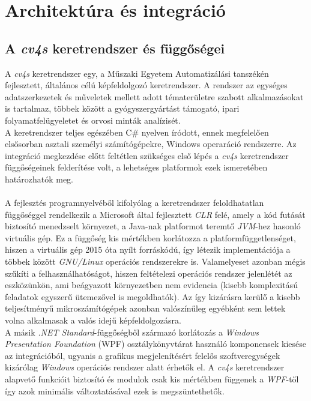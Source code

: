 \chapter{Architektúra és integráció} \label{chapter:architektura}

\section{A \emph{cv4s} keretrendszer és függőségei} \label{fuggosegek}


A \emph{cv4s} keretrendszer egy, a Műszaki Egyetem Automatizálási tanszékén fejlesztett, általános célú képfeldolgozó keretrendszer. A rendszer az egységes adatszerkezetek és műveletek mellett adott tématerületre szabott alkalmazásokat is tartalmaz, többek között a gyógyszergyártást támogató, ipari folyamatfelügyeletet és orvosi minták analízisét. \\
A keretrendszer teljes egészében C\# nyelven íródott, ennek megfelelően elsősorban asztali személyi számítógépekre, Windows operaráció rendszerre. Az integráció megkezdése előtt feltétlen szükséges első lépés a \emph{cv4s} keretrendszer függőségeinek felderítése volt, a lehetséges platformok ezek ismeretében határozhatók meg. \\
\\
A fejlesztés programnyelvéből kifolyólag a keretrendszer feloldhatatlan függőséggel rendelkezik a Microsoft által fejlesztett \emph{CLR} felé, amely a kód futását biztosító menedzselt környezet, a Java-nak platformot teremtő \emph{JVM}-hez hasonló virtuális gép. Ez a függőség kis mértékben korlátozza a platformfüggetlenséget, hiszen a virtuális gép 2015 óta nyílt forráskódú, így létezik implementációja a többek között \emph{GNU/Linux} operációs rendszerekre is. Valamelyeset azonban mégis szűkíti a felhasználhatóságot, hiszen feltételezi operációs rendszer jelenlétét az eszközünkön, ami beágyazott környezetben nem evidencia (kisebb komplexitású feladatok egyszerű ütemezővel is megoldhatók). Az így kizárásra kerülő a kisebb teljesítményű mikroszámítógépek azonban valószínűleg egyébként sem lettek volna alkalmasak a valós idejű képfeldolgozásra. \\
A másik \emph{.NET Standard}-függőségből származó korlátozás a \emph{Windows Presentation Foundation} (WPF) osztálykönyvtárat használó komponensek kiesése az integrációból, ugyanis a grafikus megjelenítésért felelős szoftveregységek kizárólag \textit{Windows} operációs rendszer alatt érhetők el. A \emph{cv4s} keretrendszer alapvető funkcióit biztosító  és  modulok csak kis mértékben függenek a \emph{WPF}-től így azok minimális változtatásával ezek is megszüntethetők.\\
